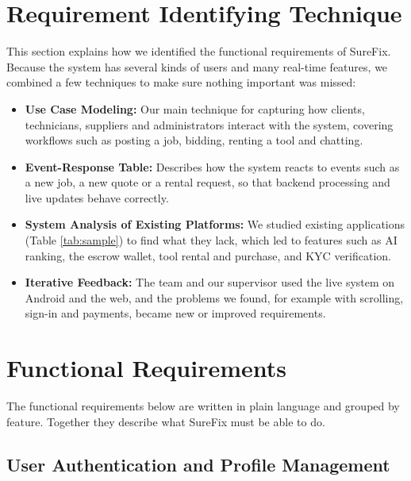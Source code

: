 \documentclass[A4paper,12pt]{report}
\theoremstyle{plain}
\theoremstyle{definition}
\theoremstyle{remark}
\numberwithin{equation}{section}
\begin{document}
\section{Requirement Identifying Technique}
This section explains how we identified the functional requirements of SureFix. Because the system has several kinds of users and many real-time features, we combined a few techniques to make sure nothing important was missed:

\begin{itemize}
	\item \textbf{Use Case Modeling:} Our main technique for capturing how clients, technicians, suppliers and administrators interact with the system, covering workflows such as posting a job, bidding, renting a tool and chatting.
	\item \textbf{Event-Response Table:} Describes how the system reacts to events such as a new job, a new quote or a rental request, so that backend processing and live updates behave correctly.
    
	\item \textbf{System Analysis of Existing Platforms:
}We studied existing applications (Table \ref{tab:sample}) to find what they lack, which led to features such as AI ranking, the escrow wallet, tool rental and purchase, and KYC verification.
    \item \textbf{Iterative Feedback:} The team and our supervisor used the live system on Android and the web, and the problems we found, for example with scrolling, sign-in and payments, became new or improved requirements.
\end{itemize}



\section{Functional Requirements}
The functional requirements below are written in plain language and grouped by feature. Together they describe what SureFix must be able to do.





\subsection{User Authentication and Profile Management}
\end{document}
